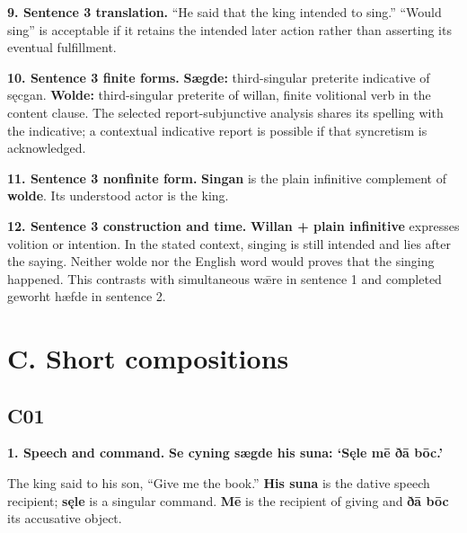 \textbf{9. Sentence 3 translation.} “He said that the king intended to sing.” “Would sing” is acceptable if it retains the intended later action rather than asserting its eventual fulfillment.

\textbf{10. Sentence 3 finite forms.} \textbf{Sægde:} third-singular preterite indicative of sęcgan. \textbf{Wolde:} third-singular preterite of willan, finite volitional verb in the content clause. The selected report-subjunctive analysis shares its spelling with the indicative; a contextual indicative report is possible if that syncretism is acknowledged.

\textbf{11. Sentence 3 nonfinite form.} \textbf{Singan} is the plain infinitive complement of \textbf{wolde}. Its understood actor is the king.

\textbf{12. Sentence 3 construction and time.} \textbf{Willan + plain infinitive} expresses volition or intention. In the stated context, singing is still intended and lies after the saying. Neither wolde nor the English word would proves that the singing happened. This contrasts with simultaneous wǣre in sentence 1 and completed geworht hæfde in sentence 2.

\section*{C. Short compositions}

\subsection*{C01}

\textbf{1. Speech and command.} \textbf{Se cyning sægde his suna: ‘Sęle mē ðā bōc.’}

The king said to his son, “Give me the book.” \textbf{His suna} is the dative speech recipient; \textbf{sęle} is a singular command. \textbf{Mē} is the recipient of giving and \textbf{ðā bōc} its accusative object.

